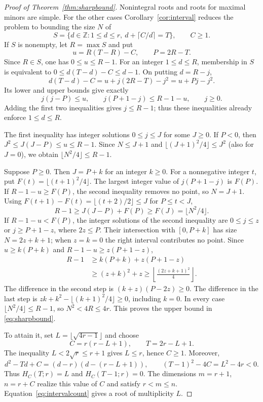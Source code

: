 \documentclass[11pt,a4paper]{article}
\numberwithin{equation}{section}
\theoremstyle{definition}
\newcommand{\Z}{\mathbb Z}
\begin{document}
\begin{proof}[Proof of Theorem~\ref{thm:sharpbound}]
Nonintegral roots and roots for maximal minors are simple. For the
other cases Corollary~\ref{cor:interval} reduces the problem to
bounding the size $N$ of
\[
S=\{d\in\Z:1\le d\le r,\ d+\lceil C/d\rceil=T\},\qquad C\ge1.
\]
If $S$ is nonempty, let $R=\max S$ and put
\[
u=R(T-R)-C,\qquad P=2R-T.
\]
Since $R\in S$, one has $0\le u\le R-1$.
For an integer $1\le d\le R$, membership in $S$ is
equivalent to $0\le d(T-d)-C\le d-1$. On putting $d=R-j$,
\[
d(T-d)-C=u+j(2R-T)-j^2=u+Pj-j^2.
\]
Its lower and upper bounds give exactly
\begin{equation}\label{eq:shell}
j(j-P)\le u,\qquad j(P+1-j)\le R-1-u,\qquad j\ge0.
\end{equation}
Adding the first two inequalities gives $j\le R-1$; thus these
inequalities already enforce $1\le d\le R$.

The first inequality has integer solutions $0\le j\le J$ for some
$J\ge0$. If $P<0$, then
$J^2\le J(J-P)\le u\le R-1$. Since $N\le J+1$ and
$\lfloor(J+1)^2/4\rfloor\le J^2$ (also for $J=0$), we obtain
$\lfloor N^2/4\rfloor\le R-1$.

Suppose $P\ge0$. Then $J=P+k$ for an integer $k\ge0$.
For a nonnegative integer $t$, put $F(t)=\lfloor(t+1)^2/4\rfloor$.
The largest integer value of $j(P+1-j)$ is $F(P)$.
If $R-1-u\ge F(P)$, the second inequality removes no point, so $N=J+1$.
Using $F(t+1)-F(t)=\lfloor(t+2)/2\rfloor\le J$ for $P\le t<J$,
\[
R-1\ge J(J-P)+F(P)\ge F(J)=\lfloor N^2/4\rfloor.
\]
If $R-1-u<F(P)$, the integer solutions of the second inequality are
$0\le j\le z$ or $j\ge P+1-z$, where $2z\le P$.
Their intersection with $[0,P+k]$ has size $N=2z+k+1$;
when $z=k=0$ the right interval contributes no point.
Since $u\ge k(P+k)$ and $R-1-u\ge z(P+1-z)$,
\begin{align*}
R-1&\ge k(P+k)+z(P+1-z)\\
   &\ge(z+k)^2+z
    \ge\left\lfloor\frac{(2z+k+1)^2}{4}\right\rfloor.
\end{align*}
The difference in the second step is $(k+z)(P-2z)\ge0$.
The difference in the last step is
$zk+k^2-\lfloor(k+1)^2/4\rfloor\ge0$, including $k=0$.
In every case $\lfloor N^2/4\rfloor\le R-1$, so
$N^2<4R\le4r$. This proves the upper bound in \eqref{eq:sharpbound}.

To attain it, set $L=\lfloor\sqrt{4r-1}\rfloor$ and choose
\[
C=r(r-L+1),\qquad T=2r-L+1.
\]
The inequality $L<2\sqrt r\le r+1$ gives $L\le r$, hence $C\ge1$.
Moreover,
\[
d^2-Td+C=(d-r)(d-(r-L+1)),\qquad
(T-1)^2-4C=L^2-4r<0.
\]
Thus $H_C(T;r)=L$ and $H_C(T-1;r)=0$.
The dimensions $m=r+1$, $n=r+C$ realize this value of $C$ and
satisfy $r<m\le n$. Equation~\eqref{eq:intervalcount} gives a root
of multiplicity $L$.
\end{proof}
\end{document}

